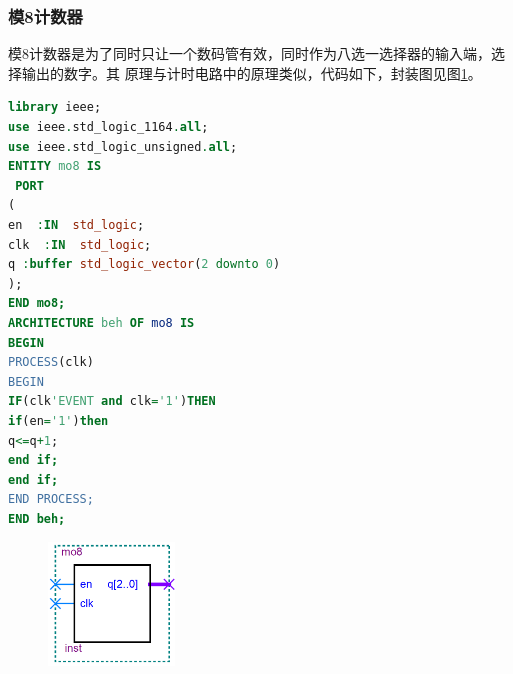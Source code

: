 \documentclass[12pt]{article}
\begin{document}
\subsubsection{模8计数器}模8计数器是为了同时只让一个数码管有效，同时作为八选一选择器的输入端，选择输出的数字。其
原理与计时电路中的原理类似，代码如下，封装图见图\ref{fig:mo8}。
\begin{lstlisting}[language=VHDL]
library ieee;
use ieee.std_logic_1164.all;
use ieee.std_logic_unsigned.all;
ENTITY mo8 IS 
 PORT
(
en  :IN  std_logic;
clk  :IN  std_logic;
q :buffer std_logic_vector(2 downto 0)
);
END mo8;
ARCHITECTURE beh OF mo8 IS
BEGIN
PROCESS(clk)
BEGIN
IF(clk'EVENT and clk='1')THEN
if(en='1')then
q<=q+1;
end if;
end if;
END PROCESS;
END beh;
\end{lstlisting}\par
\begin{figure}[hp]
	\centering  
	\includegraphics[width=0.3\textwidth]{picture/mo8.png} 
	\caption{}
	\label{fig:mo8}   
\end{figure}
\end{document}
